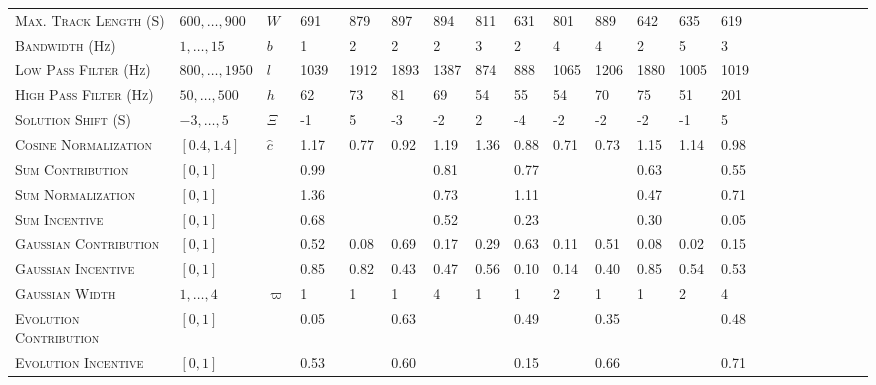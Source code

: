 \documentclass[twocolumn]{article}
\begin{document}
\begin{table}[h]
{\begin{tabular}{llll@{}llllllllllllllllll@{}}
		\textsc{Max. Track Length (S) }     & $600,\ldots,900$  & $W$        & 691   & 879  & 897  & 894  & 811  & 631  & 801  & 889  & 642  & 635  & 619  &  \\
		\textsc{Bandwidth (Hz)      }       & $1,\ldots,15$     & $b$        & 1     & 2    & 2    & 2    & 3    & 2    & 4    & 4    & 2    & 5    & 3    &  \\
		\textsc{Low Pass Filter (Hz) }      & $800,\ldots,1950$ & $l$        & 1039~ & 1912 & 1893 & 1387 & 874  & 888  & 1065 & 1206 & 1880 & 1005 & 1019 &  \\
		\textsc{High Pass Filter (Hz)}      & $50,\ldots,500$   & $h$        & 62    & 73   & 81   & 69   & 54   & 55   & 54   & 70   & 75   & 51   & 201  &  \\
		\textsc{Solution Shift (S) }        & $-3,\ldots,5$     & $ \varXi $ & -1    & 5    & -3   & -2   & 2    & -4   & -2   & -2   & -2   & -1   & 5    &  \\
		\textsc{Cosine Normalization }      & $[0.4,1.4]$       & $\hat c$   & 1.17  & 0.77 & 0.92 & 1.19 & 1.36 & 0.88 & 0.71 & 0.73 & 1.15 & 1.14 & 0.98 &  \\ \midrule
		\textsc{Sum Contribution  }         & $[0,1]$           &            & 0.99  &      &      & 0.81 &      & 0.77 &      &      & 0.63 &      & 0.55 &  \\
		\textsc{Sum Normalization }         & $[0,1]$           &            & 1.36  &      &      & 0.73 &      & 1.11 &      &      & 0.47 &      & 0.71 &  \\
		\textsc{Sum Incentive      }        & $[0,1]$           &            & 0.68  &      &      & 0.52 &      & 0.23 &      &      & 0.30 &      & 0.05 &  \\ \midrule
		\textsc{Gaussian Contribution  }    & $[0,1]$           &            & 0.52  & 0.08 & 0.69 & 0.17 & 0.29 & 0.63 & 0.11 & 0.51 & 0.08 & 0.02 & 0.15 &  \\
		\textsc{Gaussian Incentive}         & $[0,1]$           &            & 0.85  & 0.82 & 0.43 & 0.47 & 0.56 & 0.10 & 0.14 & 0.40 & 0.85 & 0.54 & 0.53 &  \\
		\textsc{Gaussian Width  }           & $1,\ldots,4$      & $\varpi$   & 1     & 1    & 1    & 4    & 1    & 1    & 2    & 1    & 1    & 2    & 4    &  \\ \midrule
		\textsc{Evolution Contribution}     & $[0,1]$           &            & 0.05  &      & 0.63 &      &      & 0.49 &      & 0.35 &      &      & 0.48 &  \\
		\textsc{Evolution Incentive}        & $[0,1]$           &            & 0.53  &      & 0.60 &      &      & 0.15 &      & 0.66 &      &      & 0.71 &  \\

\end{tabular}}
\end{table}
\end{document}
